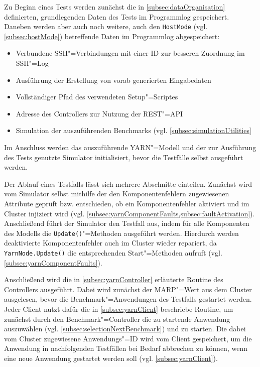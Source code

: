 Zu Beginn eines Tests werden zunächst die in \cref{subsec:dataOrganisation} definierten, grundlegenden Daten des Tests im Programmlog gespeichert.
Daneben werden aber auch noch weitere, auch den \texttt{HostMode} (vgl. \cref{subsec:hostMode}) betreffende Daten im Programmlog abgespeichert:

\begin{itemize}
    \item Verbundene SSH"=Verbindungen mit einer ID zur besseren Zuordnung im SSH"=Log
    \item Ausführung der Erstellung von vorab generierten Eingabedaten
    \item Vollständiger Pfad des verwendeten Setup"=Scriptes
    \item Adresse des Controllers zur Nutzung der REST"=API
    \item Simulation der auszuführenden Benchmarks (vgl. \cref{subsec:simulationUtilities}
\end{itemize}

Im Anschluss werden das auszuführende YARN"=Modell und der zur Ausführung des Tests genutzte Simulator initialisiert, bevor die Testfälle selbst ausgeführt werden.

Der Ablauf eines Testfalls lässt sich mehrere Abschnitte einteilen.
Zunächst wird vom Simulator selbst mithilfe der den Komponentenfehlern zugewiesenen Attribute geprüft bzw. entschieden, ob ein Komponentenfehler aktiviert und im Cluster injiziert wird (vgl. \cref{subsec:yarnComponentFaults,subsec:faultActivation}).
Anschließend führt der Simulator den Testfall aus, indem für alle Komponenten des Modells die \texttt{Update()}"=Methoden ausgeführt werden.
Hierdurch werden deaktivierte Komponentenfehler auch im Cluster wieder repariert, da \texttt{YarnNode.Update()} die entsprechenden Start"=Methoden aufruft (vgl. \cref{subsec:yarnComponentFaults}).

Anschließend wird die in \cref{subsec:yarnController} erläuterte Routine des Controllers ausgeführt.
Dabei wird zunächst der \gls{MARP}"=Wert aus dem Cluster ausgelesen, bevor die Benchmark"=Anwendungen des Testfalls gestartet werden.
Jeder Client nutzt dafür die in \cref{subsec:yarnClient} beschriebe Routine, um zunächst durch den Benchmark"=Controller die zu startende Anwendung auszuwählen (vgl. \cref{subsec:selectionNextBenchmark}) und zu starten.
Die dabei vom Cluster zugewiesene Anwendungs"=ID wird vom Client gespeichert, um die Anwendung in nachfolgenden Testfällen bei Bedarf abbrechen zu können, wenn eine neue Anwendung gestartet werden soll (vgl. \cref{subsec:yarnClient}).


